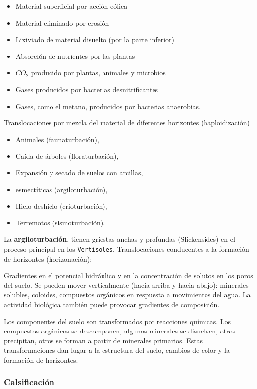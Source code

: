 \begin{itemize}
    \item Material superficial por acción eólica
    \item Material eliminado por erosión
    \item Lixiviado de material disuelto (por la parte inferior)
    \item Absorción de nutrientes por las plantas
    \item $CO_2$ producido por plantas, animales y microbios
    \item Gases producidos por bacterias desnitrificantes
    \item Gases, como el metano, producidos por bacterias anaerobias.
\end{itemize}

Translocaciones por mezcla del material de diferentes horizontes (haploidización)
\begin{itemize}
    \item Animales (faunaturbación),
    \item Caída de árboles (floraturbación),
    \item Expansión y secado de suelos con arcillas,
    \item esmectíticas (argiloturbación),
    \item Hielo-deshielo (crioturbación),
    \item Terremotos (sismoturbación).
\end{itemize}

La \textbf{argiloturbación}, tienen griestas anchas y profundas (Slickensides) en el proceso principal en los \texttt{Vertisoles}.
Translocaciones conducentes a la formación de horizontes (horizonación):

Gradientes en el potencial hidráulico y en la concentración de solutos en los poros del suelo.
Se pueden mover verticalmente (hacia arriba y hacia abajo): minerales solubles, coloides, compuestos orgánicos en respuesta a movimientos del agua.
La actividad biológica también puede provocar gradientes de composición.

Los componentes del suelo son transformados por reacciones químicas.
Los compuestos orgánicos se descomponen, algunos minerales se disuelven, otros precipitan, otros se forman a partir de minerales primarios.
Estas transformaciones dan lugar a la estructura del suelo, cambios de color y la formación de horizontes.

\subsubsection{Calsificación}

